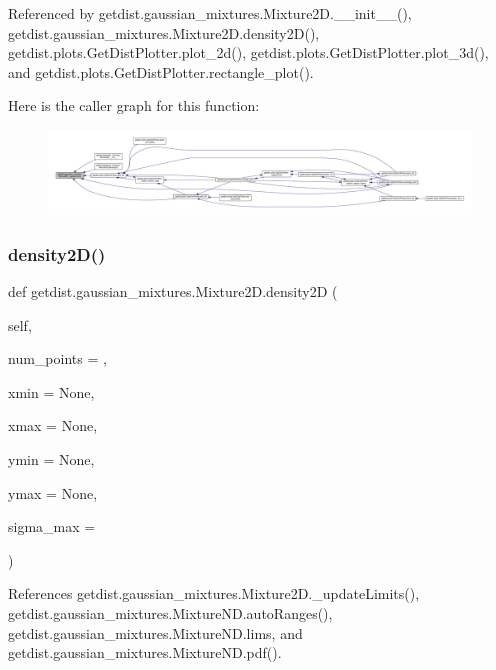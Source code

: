 Referenced by getdist.\+gaussian\+\_\+mixtures.\+Mixture2\+D.\+\_\+\+\_\+init\+\_\+\+\_\+(), getdist.\+gaussian\+\_\+mixtures.\+Mixture2\+D.\+density2\+D(), getdist.\+plots.\+Get\+Dist\+Plotter.\+plot\+\_\+2d(), getdist.\+plots.\+Get\+Dist\+Plotter.\+plot\+\_\+3d(), and getdist.\+plots.\+Get\+Dist\+Plotter.\+rectangle\+\_\+plot().

Here is the caller graph for this function\+:
\nopagebreak
\begin{figure}[H]
\begin{center}
\leavevmode
\includegraphics[width=350pt]{classgetdist_1_1gaussian__mixtures_1_1Mixture2D_a605ecb70ffec33463e92a7c475acd158_icgraph}
\end{center}
\end{figure}
\mbox{\label{classgetdist_1_1gaussian__mixtures_1_1Mixture2D_a75c659c0a74007a020773d90f324f6bc}} 
\subsubsection{\texorpdfstring{density2\+D()}{density2D()}}
{\footnotesize\ttfamily def getdist.\+gaussian\+\_\+mixtures.\+Mixture2\+D.\+density2D (\begin{DoxyParamCaption}\item[{}]{self,  }\item[{}]{num\+\_\+points = {},  }\item[{}]{xmin = {\ttfamily None},  }\item[{}]{xmax = {\ttfamily None},  }\item[{}]{ymin = {\ttfamily None},  }\item[{}]{ymax = {\ttfamily None},  }\item[{}]{sigma\+\_\+max = {} }\end{DoxyParamCaption})}



References getdist.\+gaussian\+\_\+mixtures.\+Mixture2\+D.\+\_\+update\+Limits(), getdist.\+gaussian\+\_\+mixtures.\+Mixture\+N\+D.\+auto\+Ranges(), getdist.\+gaussian\+\_\+mixtures.\+Mixture\+N\+D.\+lims, and getdist.\+gaussian\+\_\+mixtures.\+Mixture\+N\+D.\+pdf().

